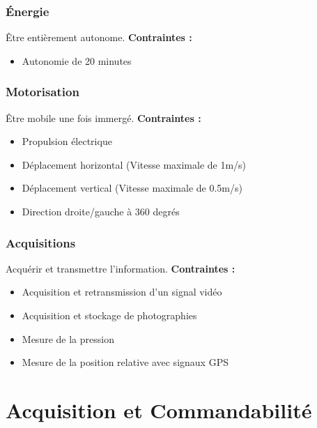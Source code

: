 \documentclass[a4paper,11pt]{report}
\begin{document}
						\subsection{Énergie}
								Être entièrement autonome. \newline
								\textbf{Contraintes :}
								\begin{itemize}
										\item Autonomie de 20 minutes
								\end{itemize}

						\subsection{Motorisation}
								Être mobile une fois immergé. \newline
								\textbf{Contraintes :}
								\begin{itemize}
										\item Propulsion électrique
										\item Déplacement horizontal (Vitesse maximale de 1m/s)
										\item Déplacement vertical (Vitesse maximale de 0.5m/s)
										\item Direction droite/gauche à 360 degrés   \newline \newline
								\end{itemize}

						\subsection{Acquisitions}
								Acquérir et transmettre l'information. \newline
								\textbf{Contraintes :}
								\begin{itemize}
										\item Acquisition et retransmission d'un signal vidéo
										\item Acquisition et stockage de photographies
										\item Mesure de la pression
										\item Mesure de la position relative avec signaux GPS
								\end{itemize}
								
\chapter{Acquisition et Commandabilité}
	
\end{document}
